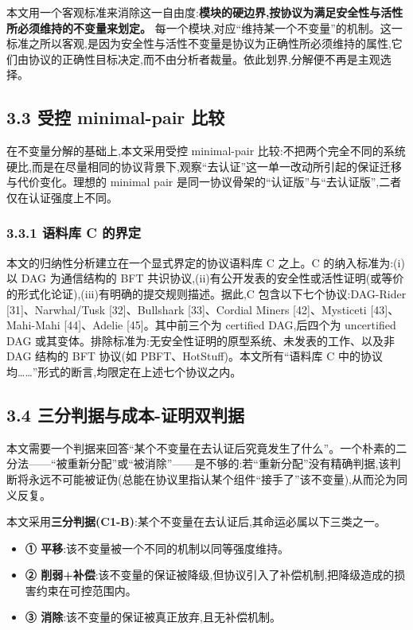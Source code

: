 \documentclass[UTF8,fontset=windows,a4paper,11pt]{ctexart}
\providecommand{\tightlist}{\setlength{\itemsep}{0pt}\setlength{\parskip}{0pt}}
\begin{document}
本文用一个客观标准来消除这一自由度:\textbf{模块的硬边界,按协议为满足安全性与活性所必须维持的不变量来划定。}
每一个模块,对应``维持某一个不变量''的机制。这一标准之所以客观,是因为安全性与活性不变量是协议为正确性所必须维持的属性,它们由协议的正确性目标决定,而不由分析者裁量。依此划界,分解便不再是主观选择。

\subsection{3.3 受控 minimal-pair
比较}\label{ux53d7ux63a7-minimal-pair-ux6bd4ux8f83}

在不变量分解的基础上,本文采用受控 minimal-pair
比较:不把两个完全不同的系统硬比,而是在尽量相同的协议背景下,观察``去认证''这一单一改动所引起的保证迁移与代价变化。理想的
minimal pair
是同一协议骨架的``认证版''与``去认证版'',二者仅在认证强度上不同。

\subsubsection{3.3.1 语料库 C 的界定}\label{ux8bedux6599ux5e93-c-ux7684ux754cux5b9a}

本文的归纳性分析建立在一个显式界定的协议语料库 C 之上。C 的纳入标准为:(i)以 DAG 为通信结构的 BFT 共识协议,(ii)有公开发表的安全性或活性证明(或等价的形式化论证),(iii)有明确的提交规则描述。据此,C 包含以下七个协议:DAG-Rider {[}31{]}、Narwhal/Tusk {[}32{]}、Bullshark {[}33{]}、Cordial Miners {[}42{]}、Mysticeti {[}43{]}、Mahi-Mahi {[}44{]}、Adelie {[}45{]}。其中前三个为 certified DAG,后四个为 uncertified DAG 或其变体。排除标准为:无安全性证明的原型系统、未发表的工作、以及非 DAG 结构的 BFT 协议(如 PBFT、HotStuff)。本文所有``语料库 C 中的协议均\ldots\ldots''形式的断言,均限定在上述七个协议之内。

\subsection{3.4
三分判据与成本-证明双判据}\label{ux4e09ux5206ux5224ux636eux4e0eux6210ux672c-ux8bc1ux660eux53ccux5224ux636e}

本文需要一个判据来回答``某个不变量在去认证后究竟发生了什么''。一个朴素的二分法------``被重新分配''或``被消除''------是不够的:若``重新分配''没有精确判据,该判断将永远不可能被证伪(总能在协议里指认某个组件``接手了''该不变量),从而沦为同义反复。

本文采用\textbf{三分判据(C1-B)}:某个不变量在去认证后,其命运必属以下三类之一。

\begin{itemize}
\tightlist
\item
  \textbf{① 平移}:该不变量被一个不同的机制以同等强度维持。
\item
  \textbf{②
  削弱+补偿}:该不变量的保证被降级,但协议引入了补偿机制,把降级造成的损害约束在可控范围内。
\item
  \textbf{③ 消除}:该不变量的保证被真正放弃,且无补偿机制。
\end{itemize}
\end{document}
